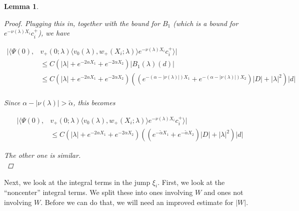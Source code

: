\documentclass[12pt]{article}
\newtheorem{lemma}{Lemma}
\begin{document}
\begin{lemma}
\begin{proof}
Plugging this in, together with the bound for $B_1$ (which is a bound for $e^{-\nu(\lambda)X_i} c_i^+$), we have

\begin{align*}
|\langle \Psi(0), &v_+(0; \lambda) \langle v_0(\lambda), w_+(X_i; \lambda) \rangle e^{-\nu(\lambda)X_i} c_i^+ \rangle| \\ 
&\leq C ( |\lambda| + e^{-2 \alpha X_1} + e^{-2 \alpha X_2} ) |B_1(\lambda)(d)| \\
&\leq C ( |\lambda| + e^{-2 \alpha X_1} + e^{-2 \alpha X_2} )
( ( e^{-(\alpha - |\nu(\lambda)|) X_1} + e^{-(\alpha - |\nu(\lambda)|) X_2}) |D| + |\lambda|^2 )|d| \\
\end{align*}

Since $\alpha - |\nu(\lambda)| > \tilde{\alpha}$, this becomes 

\begin{align*}
|\langle \Psi(0), &v_+(0; \lambda) \langle v_0(\lambda), w_+(X_i; \lambda) \rangle e^{-\nu(\lambda)X_i} c_i^+ \rangle| \\
&\leq C ( |\lambda| + e^{-2 \alpha X_1} + e^{-2 \alpha X_2} )
( ( e^{-\tilde{\alpha} X_1} + e^{-\tilde{\alpha} X_2}) |D| + |\lambda|^2 )|d| 
\end{align*}
 
The other one is similar.\\

\end{proof} 
\end{lemma}

Next, we look at the integral terms in the jump $\xi_i$. First, we look at the ``noncenter'' integral terms. We split these into ones involving $W$ and ones not involving $W$. Before we can do that, we will need an improved estimate for $|W|$.
\end{document}
